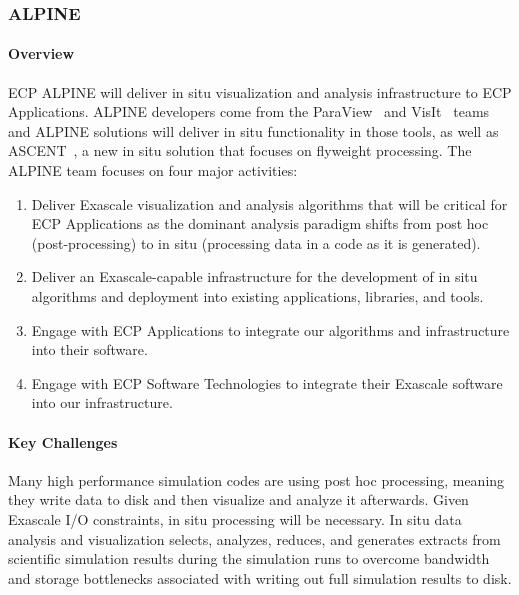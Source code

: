 \subsubsection{ALPINE} 


\paragraph{Overview} 

ECP ALPINE will deliver in situ visualization and analysis infrastructure to ECP Applications.  
%
ALPINE developers come from the ParaView~\cite{paraview1,paraview2} and VisIt~\cite{VisIt} teams and ALPINE solutions will deliver in situ functionality in those tools, as
well as ASCENT~\cite{ASCENT}, a new in situ solution that focuses on flyweight processing. 
%
The ALPINE team focuses on four major activities: 
\begin{enumerate}
        \setlength{\itemsep}{1pt}
        \setlength{\parskip}{0pt}
        \setlength{\parsep}{0pt}
\item Deliver Exascale visualization and analysis algorithms that will be critical for ECP Applications as the dominant analysis paradigm shifts from post hoc (post-processing) to in situ (processing data in a code as it is generated). 
\item Deliver an Exascale-capable infrastructure for the development of in situ algorithms and deployment into existing applications, libraries, and tools. 
\item Engage with ECP Applications to integrate our algorithms and infrastructure into their software. 
\item Engage with ECP Software Technologies to integrate their Exascale software into our infrastructure. 
\end{enumerate}


\paragraph{Key  Challenges}

Many high performance simulation codes are using post hoc processing, meaning they write data to disk and then visualize and analyze it afterwards. 
%
Given Exascale I/O constraints, in situ processing will be necessary. 
%
In situ data analysis and visualization selects, analyzes, reduces, and generates extracts from scientific simulation results during the simulation runs to overcome bandwidth and storage bottlenecks associated with writing out full simulation results to disk. 

